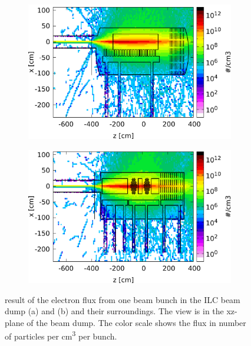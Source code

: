 \begin{figure}[!h]
 \centering
  \begin{subfigure}[b]{0.49\textwidth}
   \centering
    \includegraphics[width=\textwidth]{Figures/BeamDump/Electron_flux_xz_Design1.png}
   \caption{\designone}
   \end{subfigure}
   \hfill
    \begin{subfigure}[b]{0.49\textwidth}
   \centering
    \includegraphics[width=\textwidth]{Figures/BeamDump/Electron_flux_xz_Design2.png}
   \caption{\designtwo}
   \end{subfigure}
   \caption[Electron flux in the ILC main beam dump]{\fluka result of the electron flux from one beam bunch in the ILC beam dump \designone (a) and \designtwo (b) and their surroundings.
   The view is in the xz-plane of the beam dump.
   The color scale shows the flux in number of particles per \si[detect-all]{\centi\meter\cubed} per bunch.}
   \label{fig:BeamDumps:Electrons}
\end{figure} 
